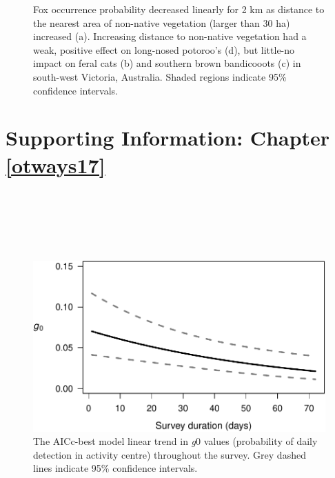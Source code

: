 \documentclass[11pt,a4paper,titlepage,twoside,openright]{style/unimelbthesis}
\begin{document}
\begin{mainmatter}
\begin{figure}
{}

\caption{Fox occurrence probability decreased linearly for 2 km as distance to the nearest area of non-native vegetation (larger than 30 ha) increased (a). Increasing distance to non-native vegetation had a weak, positive effect on long-nosed potoroo's (d), but little-no impact on feral cats (b) and southern brown bandicooots (c) in south-west Victoria, Australia. Shaded regions indicate 95\% confidence intervals.}\label{fig:occ-dist}
\end{figure}
\newpage

\hypertarget{otways17-app}{%
\chapter{Supporting Information: Chapter \ref{otways17}}\label{otways17-app}}

\newpage

\(~\)

\(~\)

\(~\)
\begin{figure}

{\centering \includegraphics[width=0.7\linewidth]{figure/otways17-g0t-1} 

}

\caption{The AICc-best model linear trend in \textit{g}0 values (probability of daily detection in activity centre) throughout the survey. Grey dashed lines indicate 95\% confidence intervals.}\label{fig:otways17-g0t}
\end{figure}
\newpage

\(~\)

\(~\)

\(~\)


\end{mainmatter}
\end{document}
